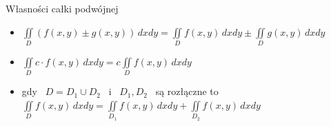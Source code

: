 \begin{tw}{Własności całki podwójnej}
\begin{itemize}
    \item $ \iint\limits_D \left( f(x,y) \pm g(x,y) \right)\, dxdy = \iint\limits_D f(x,y)\, dxdy \pm \iint\limits_D g(x,y)\, dxdy $
    \item $ \iint\limits_D c \cdot f(x,y)\, dxdy = c \iint\limits_D f(x,y)\, dxdy $
    \item gdy \ $ D = D_1 \cup D_2 $ \ i \ $ D_1, D_2 $ \ są rozłączne to
    $ \iint\limits_D f(x,y)\, dxdy = \iint\limits_{D_1} f(x,y)\, dxdy + \iint\limits_{D_2} f(x,y)\, dxdy $
\end{itemize}
\end{tw}